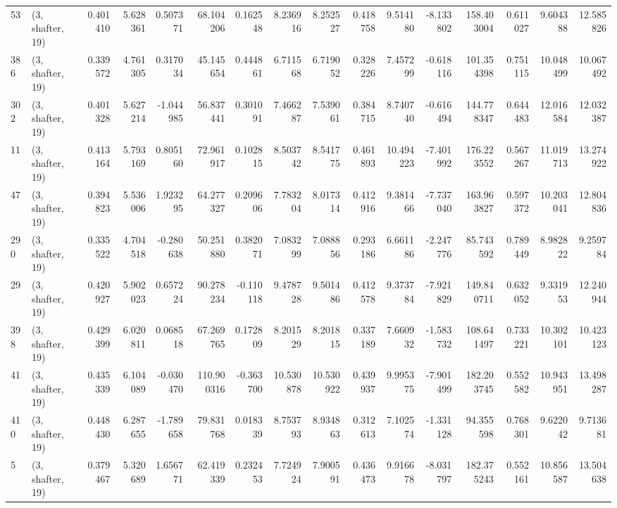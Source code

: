 \begin{tabular}{llrrrrrrrrrrrrrr}
53  &  (3, shafter, 19) &   0.401410 &   5.628361 &   0.507371 &    68.104206 &   0.162548 &   8.236916 &   8.252527 &  0.418758 &   9.514180 &  -8.133802 &   158.403004 &  0.611027 &   9.604388 &  12.585826 \\
386 &  (3, shafter, 19) &   0.339572 &   4.761305 &   0.317034 &    45.145654 &   0.444861 &   6.711568 &   6.719052 &  0.328226 &   7.457299 &  -0.618116 &   101.354398 &  0.751115 &  10.048499 &  10.067492 \\
302 &  (3, shafter, 19) &   0.401328 &   5.627214 &  -1.044985 &    56.837441 &   0.301091 &   7.466287 &   7.539061 &  0.384715 &   8.740740 &  -0.616494 &   144.778347 &  0.644483 &  12.016584 &  12.032387 \\
11  &  (3, shafter, 19) &   0.413164 &   5.793169 &   0.805160 &    72.961917 &   0.102815 &   8.503742 &   8.541775 &  0.461893 &  10.494223 &  -7.401992 &   176.223552 &  0.567267 &  11.019713 &  13.274922 \\
47  &  (3, shafter, 19) &   0.394823 &   5.536006 &   1.923295 &    64.277327 &   0.209606 &   7.783204 &   8.017314 &  0.412916 &   9.381466 &  -7.737040 &   163.963827 &  0.597372 &  10.203041 &  12.804836 \\
290 &  (3, shafter, 19) &   0.335522 &   4.704518 &  -0.280638 &    50.251880 &   0.382071 &   7.083299 &   7.088856 &  0.293186 &   6.661186 &  -2.247776 &    85.743592 &  0.789449 &   8.982822 &   9.259784 \\
29  &  (3, shafter, 19) &   0.420927 &   5.902023 &   0.657224 &    90.278234 &  -0.110118 &   9.478728 &   9.501486 &  0.412578 &   9.373784 &  -7.921829 &   149.840711 &  0.632052 &   9.331953 &  12.240944 \\
398 &  (3, shafter, 19) &   0.429399 &   6.020811 &   0.068518 &    67.269765 &   0.172809 &   8.201529 &   8.201815 &  0.337189 &   7.660932 &  -1.583732 &   108.641497 &  0.733221 &  10.302101 &  10.423123 \\
41  &  (3, shafter, 19) &   0.435339 &   6.104089 &  -0.030470 &   110.900316 &  -0.363700 &  10.530878 &  10.530922 &  0.439937 &   9.995375 &  -7.901499 &   182.203745 &  0.552582 &  10.943951 &  13.498287 \\
410 &  (3, shafter, 19) &   0.448430 &   6.287655 &  -1.789658 &    79.831768 &   0.018339 &   8.753793 &   8.934863 &  0.312613 &   7.102574 &  -1.331128 &    94.355598 &  0.768301 &   9.622042 &   9.713681 \\
5   &  (3, shafter, 19) &   0.379467 &   5.320689 &   1.656771 &    62.419339 &   0.232453 &   7.724924 &   7.900591 &  0.436473 &   9.916678 &  -8.031797 &   182.375243 &  0.552161 &  10.856587 &  13.504638 \\

\end{tabular}
